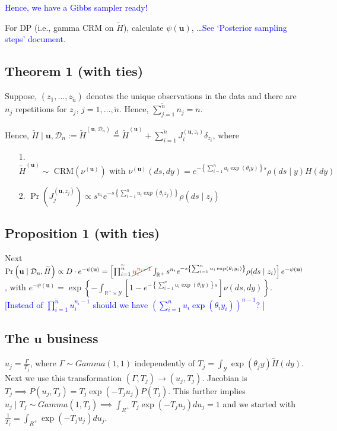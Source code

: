 \documentclass[10pt, oneside]{article}   	%
\renewcommand{\th}{\theta}
\newcommand{\thh}{\widetilde{H}}
\newcommand{\sy}{\mathcal{Y}}
\newcommand{\R}{\mathbb{R}}
\renewcommand{\sy}{\mathcal{Y}}
\newcommand{\sd}{\mathcal{D}}
\newcommand{\ub}{\mathbf{u}}
\newcommand{\tn}{{\widetilde n}}
\begin{document}
\noindent \textcolor{blue}{Hence, we have a Gibbs sampler ready!}
\vspace{3mm}

\noindent For DP (i.e., gamma CRM on $\thh$), calculate  $\psi(\ub)$, \dots \textcolor{blue}{See `Posterior sampling steps' document.}

\subsection{Theorem 1 (with ties)}
Suppose, $(z_1, \dots, z_\tn)$ denotes the unique observations in the data and there are $n_j$ repetitions for $z_j$, $j = 1, \dots, \tn$. Hence, $\sum_{j=1}^{\tn} n_j = n$.
\vspace{1mm}

\noindent Hence, $\thh \mid \ub, \sd_n := \thh^{(\ub, \sd_n)} \stackrel{d}{=} \thh^{(\ub)} + \sum_{i=1}^\tn J^{(\ub, z_i)}_i \delta_{z_i}$, where 
\begin{enumerate}
 \item[1.]  $\thh^{(\ub)} \sim \text{ CRM}\left(\nu^{(\ub)}\right) \text{ with } \nu^{(\ub)} (ds, dy) = e^{- \left\{\sum_{i=1}^n u_i \exp(\th_i y) \right\} s} \rho(ds \mid y) H(dy)$
 \item[2.] $\Pr\left(J^{(\ub, z_j)}_j\right) \propto s^{n_i} e^{-s \left\{\sum_{i=1}^n u_i \exp(\th_i z_j)\right\}} \rho(ds \mid z_j)$
\end{enumerate}
\subsection{Proposition 1 (with ties)}
Next $\Pr\left(\ub \mid \sd_n, \thh \right) \propto D  \cdot  e^{-\psi(\ub)} =\left[\prod_{i=1}^\tn \cancel{\textcolor{red}{u^{n_i - 1}_i}} \int_{\R^{+}} s^{n_i} e^{-s \left\{\sum_{i=1}^n u_i \exp(\th_i y_i)\right\}} \rho(ds \mid z_i)\right] e^{-\psi(\ub)}$, with $e^{-\psi(\ub)} = \exp \left \{ - \int_{\R^{+} \times \sy}  \left[1 - e^{- \left\{\sum_{i=1}^n u_i \exp(\th_i y) \right\} s} \right] \nu(ds, dy) \right\} $. \textcolor{blue}{[Instead of $\prod_{i=1}^\tn u^{n_i - 1}_i$ should we have $\left(\sum_{i=1}^n u_i \exp(\th_i y_i)\right)^{n-1}$? ]}

\vspace{2mm}

\subsection[]{The $\mathbf{u}$ business}
$u_j = \frac{\Gamma}{T_j}$, where $\Gamma \sim Gamma(1, 1)$ independently of $T_j = \int_{\sy} \exp(\theta_j y) \widetilde H(dy)$. Next we use this transformation $(\Gamma, T_j) \to (u_j, T_j)$. Jacobian is $T_j \implies P(u_j, T_j) = T_j \exp(-T_j u_j) P(T_j)$. This further implies $u_j \mid T_j \sim Gamma(1, T_j) \implies \int_{R^+} T_j \exp(-T_j u_j) du_j = 1$ and we started with $\frac{1}{T_j} = \int_{R^+} \exp(-T_j u_j) du_j$.
\end{document}
